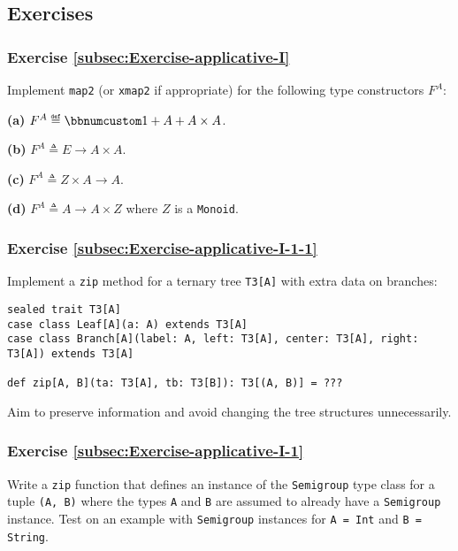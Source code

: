 \subsection{Exercises}

\subsubsection{Exercise \label{subsec:Exercise-applicative-I}\ref{subsec:Exercise-applicative-I}}

Implement \lstinline!map2! (or \lstinline!xmap2! if appropriate)
for the following type constructors $F^{A}$:

\textbf{(a)} $F^{A}\triangleq\bbnum 1+A+A\times A$.

\textbf{(b)} $F^{A}\triangleq E\rightarrow A\times A$.

\textbf{(c)} $F^{A}\triangleq Z\times A\rightarrow A$.

\textbf{(d)} $F^{A}\triangleq A\rightarrow A\times Z$ where $Z$
is a \lstinline!Monoid!.

\subsubsection{Exercise \label{subsec:Exercise-applicative-I-1-1}\ref{subsec:Exercise-applicative-I-1-1}}

Implement a \lstinline!zip! method for a ternary tree \lstinline!T3[A]!
with extra data on branches:
\begin{lstlisting}
sealed trait T3[A]
case class Leaf[A](a: A) extends T3[A]
case class Branch[A](label: A, left: T3[A], center: T3[A], right: T3[A]) extends T3[A]

def zip[A, B](ta: T3[A], tb: T3[B]): T3[(A, B)] = ???
\end{lstlisting}
Aim to preserve information and avoid changing the tree structures
unnecessarily.

\subsubsection{Exercise \label{subsec:Exercise-applicative-I-1}\ref{subsec:Exercise-applicative-I-1}}

Write a \lstinline!zip! function that defines an instance of the
\lstinline!Semigroup! type class for a tuple \lstinline!(A, B)!
where the types \lstinline!A! and \lstinline!B! are assumed to already
have a \lstinline!Semigroup! instance. Test on an example with \lstinline!Semigroup!
instances for \lstinline!A = Int! and \lstinline!B = String!.

